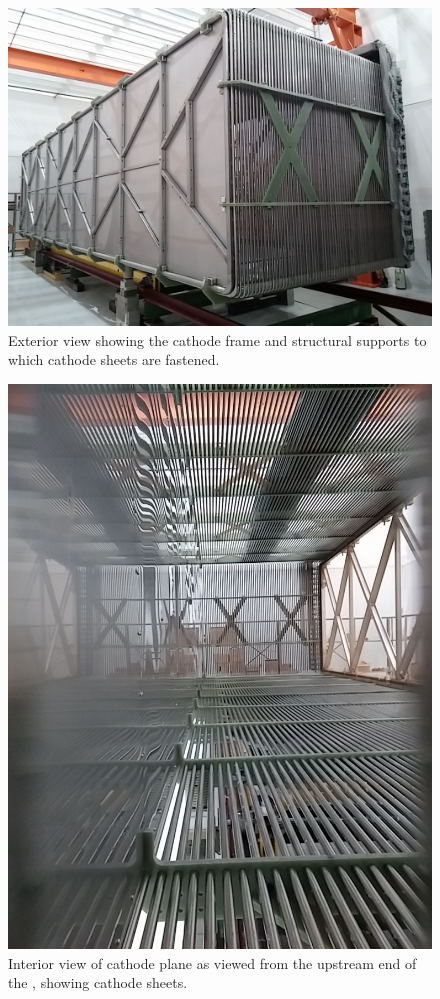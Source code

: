 \begin{figure}[htb]
\centering	
\includegraphics[width=0.55\linewidth]{figures/tpc-completed-upstream-left.jpg}
\caption{Exterior view showing the cathode frame and structural supports to which cathode sheets are fastened.}
\label{fig:tpc-cathode}
\end{figure}

\begin{figure}[htb]
\centering	
\includegraphics[width=0.55\linewidth]{figures/tpc-upstream-interior.jpg}
\caption{Interior view of cathode plane as viewed from the upstream end of the \lartpc, showing cathode sheets.}
\label{fig:tpc-cathode-interior}
\end{figure}

